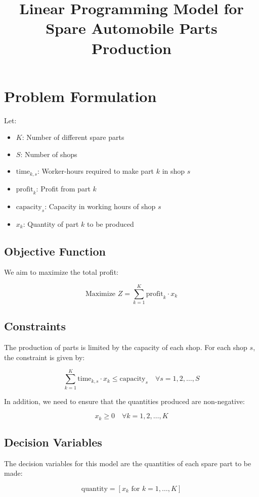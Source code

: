 \documentclass{article}
\begin{document}
\title{Linear Programming Model for Spare Automobile Parts Production}
\author{}
\date{}
\maketitle

\section*{Problem Formulation}

Let:
\begin{itemize}
    \item \( K \): Number of different spare parts
    \item \( S \): Number of shops
    \item \( \text{time}_{k, s} \): Worker-hours required to make part \( k \) in shop \( s \)
    \item \( \text{profit}_{k} \): Profit from part \( k \)
    \item \( \text{capacity}_{s} \): Capacity in working hours of shop \( s \)
    \item \( x_{k} \): Quantity of part \( k \) to be produced
\end{itemize}

\subsection*{Objective Function}

We aim to maximize the total profit:

\[
\text{Maximize } Z = \sum_{k=1}^{K} \text{profit}_{k} \cdot x_{k}
\]

\subsection*{Constraints}

The production of parts is limited by the capacity of each shop. For each shop \( s \), the constraint is given by:

\[
\sum_{k=1}^{K} \text{time}_{k,s} \cdot x_{k} \leq \text{capacity}_{s}  \quad \forall s = 1, 2, \ldots, S
\]

In addition, we need to ensure that the quantities produced are non-negative:

\[
x_{k} \geq 0  \quad \forall k = 1, 2, \ldots, K
\]

\subsection*{Decision Variables}

The decision variables for this model are the quantities of each spare part to be made:

\[
\text{quantity} = [x_{k} \text{ for } k = 1, \ldots, K]
\]
\end{document}
